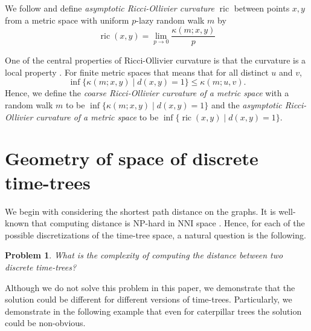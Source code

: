 \documentclass{amsart}
\newtheorem{problem}[lemma]{Problem}
\theoremstyle{definition}
\newcommand{\nni}{\mathrm{NNI}}
\newcommand{\ric}{\operatorname{ric}}
\begin{document}
{We follow \textcite{Loisel2014-gu} and define {\em asymptotic Ricci-Ollivier curvature} $\ric$ between points $x,y$ from a metric space with uniform $p$-lazy random walk $m$ by
\[
\ric(x,y) = \lim_{p\to0} \frac{\kappa(m;x,y)}{p}
\]

One of the central properties of Ricci-Ollivier curvature is that the curvature is a local property \autocite{Ollivier2009-cj}.
For finite metric spaces that means that for all distinct $u$ and $v$,
\[
\inf\{\kappa(m;x,y)\mid d(x,y) = 1\} \leq \kappa(m;u,v).
\]
Hence, we define the {\em coarse Ricci-Ollivier curvature of a metric space} with a random walk $m$ to be $\inf\{\kappa(m;x,y)\mid d(x,y) = 1\}$ and the {\em asymptotic Ricci-Ollivier curvature of a metric space} to be $\inf\{\ric(x,y)\mid d(x,y) = 1\}$.
}{}


\section{Geometry of space of discrete time-trees}

We begin with considering the shortest path distance on the graphs.
It is well-known that computing distance is NP-hard in $\nni$ space \autocite{Dasgupta2000-xa}.
Hence, for each of the possible discretizations of the time-tree space, a natural question is the following.

\begin{problem}
What is the complexity of computing the distance between two discrete time-trees?
\end{problem}

Although we do not solve this problem in this paper, we demonstrate that the solution could be different for different versions of time-trees.
Particularly, we demonstrate in the following example that even for caterpillar trees the solution could be non-obvious.
\end{document}

